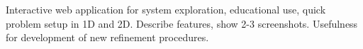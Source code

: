 Interactive web application for system exploration, educational use, quick problem setup in 1D and 2D.
Describe features, show 2-3 screenshots.
Usefulness for development of new refinement procedures.

